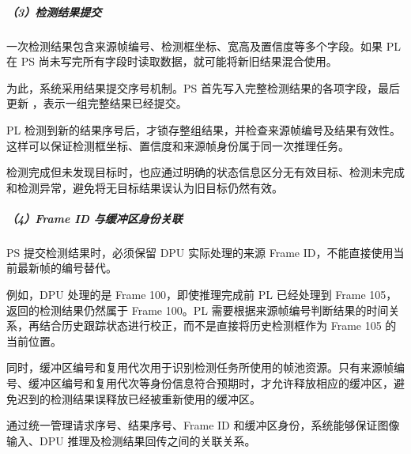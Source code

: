 \documentclass[UTF8,a4paper,12pt,fontset=windows]{ctexart}
\begin{document}
\subparagraph*{（3）检测结果提交}
一次检测结果包含来源帧编号、检测框坐标、宽高及置信度等多个字段。如果 PL 在 PS 尚未写完所有字段时读取数据，就可能将新旧结果混合使用。

为此，系统采用结果提交序号机制。PS 首先写入完整检测结果的各项字段，最后更新 ，表示一组完整结果已经提交。

PL 检测到新的结果序号后，才锁存整组结果，并检查来源帧编号及结果有效性。这样可以保证检测框坐标、置信度和来源帧身份属于同一次推理任务。

检测完成但未发现目标时，也应通过明确的状态信息区分无有效目标、检测未完成和检测异常，避免将无目标结果误认为旧目标仍然有效。

\subparagraph*{（4）Frame ID 与缓冲区身份关联}
PS 提交检测结果时，必须保留 DPU 实际处理的来源 Frame ID，不能直接使用当前最新帧的编号替代。

例如，DPU 处理的是 Frame 100，即使推理完成前 PL 已经处理到 Frame 105，返回的检测结果仍然属于 Frame 100。PL 需要根据来源帧编号判断结果的时间关系，再结合历史跟踪状态进行校正，而不是直接将历史检测框作为 Frame 105 的当前位置。

同时，缓冲区编号和复用代次用于识别检测任务所使用的帧池资源。只有来源帧编号、缓冲区编号和复用代次等身份信息符合预期时，才允许释放相应的缓冲区，避免迟到的检测结果误释放已经被重新使用的缓冲区。

通过统一管理请求序号、结果序号、Frame ID 和缓冲区身份，系统能够保证图像输入、DPU 推理及检测结果回传之间的关联关系。
\end{document}
